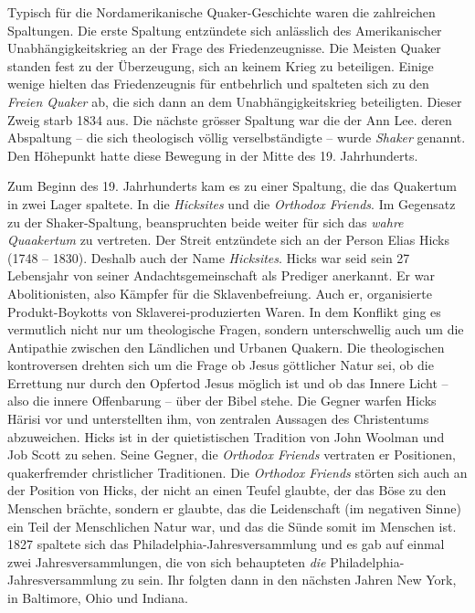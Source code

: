 \medskip

Typisch für die Nordamerikanische Quaker-Geschichte waren die zahlreichen
Spaltungen. Die erste Spaltung entzündete sich anlässlich des Amerikanischer
Unabhängigkeitskrieg an der Frage des Friedenzeugnisse. Die Meisten Quaker
standen fest zu der Überzeugung, sich an keinem Krieg zu beteiligen. Einige
wenige hielten das Friedenzeugnis für entbehrlich und spalteten sich zu den
\textit{Freien Quaker} ab, die sich dann an dem Unabhängigkeitskrieg
beteiligten. Dieser Zweig starb 1834 aus. Die nächste grösser Spaltung war die
der Ann Lee. deren Abspaltung -- die sich theologisch völlig verselbständigte --
wurde \textit{Shaker} genannt. Den Höhepunkt hatte diese Bewegung in der Mitte
des 19. Jahrhunderts.

\medskip

Zum Beginn des 19. Jahrhunderts kam es zu einer Spaltung, die das Quakertum in
zwei Lager spaltete. In die \textit{Hicksites} und die \textit{Orthodox
Friends}. Im Gegensatz zu der Shaker-Spaltung, beanspruchten beide weiter für
sich das \textit{wahre Quaakertum} zu vertreten. Der Streit entzündete sich an
der Person Elias Hicks (1748 -- 1830). Deshalb auch der Name \textit{Hicksites}.
Hicks war seid sein 27 Lebensjahr von seiner Andachtsgemeinschaft als Prediger
anerkannt. Er war Abolitionisten, also Kämpfer für die Sklavenbefreiung. Auch
er, organisierte Produkt-Boykotts von Sklaverei-produzierten Waren. In dem
Konflikt ging es vermutlich nicht nur um theologische Fragen, sondern
unterschwellig auch um die Antipathie zwischen den Ländlichen und Urbanen
Quakern. Die theologischen kontroversen drehten sich um die Frage ob Jesus
göttlicher Natur sei, ob die Errettung nur durch den Opfertod Jesus möglich ist
und ob das Innere Licht -- also die innere Offenbarung -- über der Bibel stehe.
Die Gegner warfen Hicks Härisi vor und unterstellten ihm, von zentralen
Aussagen des Christentums abzuweichen. Hicks ist in der quietistischen Tradition
von John Woolman und Job Scott zu sehen. Seine Gegner, die \textit{Orthodox
Friends} vertraten er Positionen, quakerfremder christlicher Traditionen. Die
\textit{Orthodox Friends} störten sich auch an der Position von Hicks, der nicht
an einen Teufel glaubte, der das Böse zu den Menschen brächte, sondern er
glaubte, das die Leidenschaft (im negativen Sinne) ein Teil der Menschlichen
Natur war, und das die Sünde somit im Menschen ist. 1827 spaltete sich das
Philadelphia-Jahresversammlung und es gab auf einmal zwei Jahresversammlungen,
die von sich behaupteten \textit{die} Philadelphia-Jahresversammlung zu sein.
Ihr folgten dann in den nächsten Jahren New York, in Baltimore, Ohio und
Indiana.

